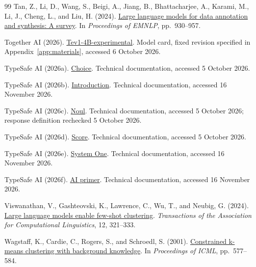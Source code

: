 \documentclass[UTF8,a4paper,zihao=-4,fontset=fandol]{ctexart}
\begin{document}
\begin{thebibliography}{99}
Tan, Z., Li, D., Wang, S., Beigi, A., Jiang, B., Bhattacharjee, A., Karami, M., Li, J., Cheng, L., and Liu, H. (2024).
\href{https://doi.org/10.18653/v1/2024.emnlp-main.54}{Large language models for data annotation and synthesis: A survey}.
In \emph{Proceedings of EMNLP}, pp.~930--957.

Together AI (2026).
\href{https://huggingface.co/togethercomputer/Tev1-4B-experimental/tree/0b7becf017daa0e5eb222f8ce7483c8c8259c52f}{Tev1-4B-experimental}.
Model card, fixed revision specified in Appendix~\ref{app:materials}, accessed 6 October 2026.

TypeSafe AI (2026a).
\href{https://docs.typesafe.ai/primitives/choice}{Choice}.
Technical documentation, accessed 5 October 2026.

TypeSafe AI (2026b).
\href{https://docs.typesafe.ai/introduction}{Introduction}.
Technical documentation, accessed 16 November 2026.

TypeSafe AI (2026c).
\href{https://docs.typesafe.ai/primitives/noul}{Noul}.
Technical documentation, accessed 5 October 2026; response definition rechecked 5 October 2026.

TypeSafe AI (2026d).
\href{https://docs.typesafe.ai/primitives/score}{Score}.
Technical documentation, accessed 5 October 2026.

TypeSafe AI (2026e).
\href{https://docs.typesafe.ai/concepts/system-one}{System One}.
Technical documentation, accessed 16 November 2026.

TypeSafe AI (2026f).
\href{https://docs.typesafe.ai/introduction/machine-learning-primer}{AI primer}.
Technical documentation, accessed 16 November 2026.

Viswanathan, V., Gashteovski, K., Lawrence, C., Wu, T., and Neubig, G. (2024).
\href{https://doi.org/10.1162/tacl_a_00648}{Large language models enable few-shot clustering}.
\emph{Transactions of the Association for Computational Linguistics}, 12, 321--333.

Wagstaff, K., Cardie, C., Rogers, S., and Schroedl, S. (2001).
\href{https://www.cs.cmu.edu/~dgovinda/pdf/icml-2001.pdf}{Constrained k-means clustering with background knowledge}.
In \emph{Proceedings of ICML}, pp.~577--584.


\end{thebibliography}
\end{document}
